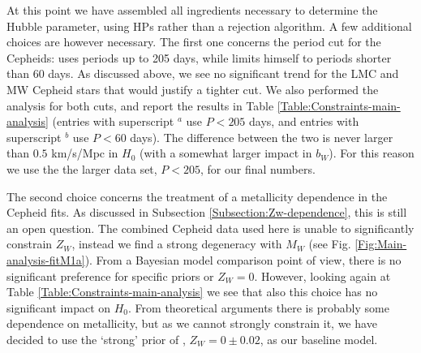 At this point we have assembled all ingredients necessary to determine the Hubble parameter, using HPs rather than a rejection algorithm. A few additional choices are however necessary. The first one concerns the period cut for the Cepheids: \cite{Riess:2011yx} uses periods up to 
205 days, while  \cite{Efstathiou:2013via} limits himself to periods shorter than 60 days. As discussed above, we see no significant trend for the LMC and MW Cepheid stars that would justify a tighter cut. We also performed the analysis for both cuts, and report the results in Table \ref{Table:Constraints-main-analysis} (entries with superscript $^{a}$ use $P<205$ days, and entries with superscript $^{b}$ use $P<60$ days). The difference between the two is never larger than $0.5$ km/s/Mpc in $H_0$ (with a somewhat larger impact in $b_W$). For this reason we use the the larger data set, $P<205$, for our
final numbers.

The second choice concerns the treatment of a metallicity dependence in the Cepheid fits. As discussed in Subsection \ref{Subsection:Zw-dependence}, this is still an open question. The combined Cepheid data used here is unable to significantly constrain $Z_W$, instead we find a strong degeneracy with $M_W$ (see Fig. \ref{Fig:Main-analysis-fitM1a}). From a Bayesian model comparison point of view, there is no significant preference for specific priors or $Z_W=0$. However, looking again at Table \ref{Table:Constraints-main-analysis} we see that also this choice has no significant impact on $H_0$. From theoretical
arguments there is probably some dependence on metallicity, but as we cannot strongly constrain it, we have decided to use the `strong' prior of \cite{Efstathiou:2013via}, $Z_W = 0 \pm 0.02$, as our baseline model.

